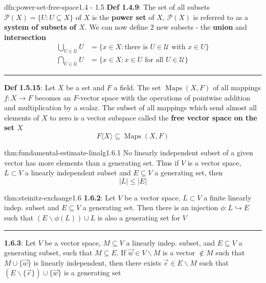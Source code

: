 \documentclass[landscape, 8pt]{extarticle}
\DeclareMathOperator{\Maps}{Maps}
\begin{document}
\begin{multicols}{3}
\begin{dfn}{dfn:power-set-free-space}{1.4 - 1.5}
    \textbf{Def 1.4.9}: The set of all subsets $\mathcal{P}(X) = \{U : U\subseteq X\}$ of $X$ is the \textbf{power set} of $X$, $\mathcal{P}(X)$ is referred to as a \textbf{system of subsets of $X$}. We can now define $2$ new subsets - the \textbf{union} and \textbf{intersection}
    \begin{align*}
        \textstyle\bigcup\limits_{U \in\mathcal{U}} U &= \{x \in X : \text{there is $U\in \mathcal{U}$ with $x\in U$}\} \\
        \textstyle\bigcap\limits_{U \in\mathcal{U}} U &= \{x \in X : \text{$x\in U$ for all $U\in \mathcal{U}$}\}
    \end{align*}

    \noindent\rule{\textwidth}{0.2pt}

    \textbf{Def 1.5.15}: Let $X$ be a set and $F$ a field. The set $\Maps(X, F)$ of all mappings $f: X \to F $ becomes an $F$-vector space with the operations of pointwise addition and multiplication by a scalar. The subset of all mappings which send almost all elements of $X$ to zero is a vector subspace called the \textbf{free vector space on the set $X$}
    \[F\langle X \rangle \subseteq \Maps(X, F)\]
\end{dfn}

\begin{thm}{thm:fundamental-estimate-linalg}{1.6.1}
    No linearly independent subset of a given vector has more elements than a generating set. Thus if $V$ is a vector space, $L \subset V$ a linearly independent subset and $E \subseteq V$ a generating set, then
    \[\lvert L \rvert \le \lvert E \rvert\]
\end{thm} 

\begin{thm}{thm:steinitz-exchange}{1.6}
    \textbf{1.6.2}: Let $V$ be a vector space, $L \subset V$ a finite linearly indep. subset and $E \subseteq V$ a generating set. Then there is an injection $\phi : L \hookrightarrow E$ such that $(E \backslash \phi(L)) \cup L$ is also a generating set for $V$
    
    \vspace{-5pt}
    \noindent\rule{\textwidth}{0.2pt}
    \textbf{1.6.3}: Let $V$ be a vector space, $M \subseteq V$ a linearly indep. subset, and $E \subseteq V$ a generating subset, such that $M \subseteq E$. If $\vec{w}\in V\backslash M$ is a vector $\not\in M$ such that $M \cup \{ \vec{w}\}$ is linearly independent, then there exists $\vec{e}\in E \backslash M$ such that $(E \backslash \{\vec{e}\}) \cup \{\vec{w}\}$ is a generating set
\end{thm}



\end{multicols}
\end{document}
